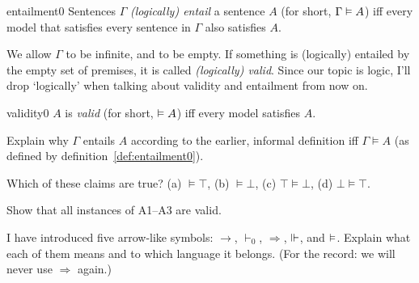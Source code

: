 \begin{definition}{}{entailment0}
  Sentences $\Gamma$ \emph{(logically) entail} a sentence $A$
  (for short, $\Gamma \vDash A$)
  iff every model that satisfies every sentence in $\Gamma$ also satisfies $A$.
\end{definition}


We allow $\Gamma$ to be infinite, and to be empty.
If something is (logically) entailed by the empty set of premises, it is called \textit{(logically) valid}.
Since our topic is logic,
I'll drop `logically' when talking about validity and entailment from now on.

\begin{definition}{}{validity0}
  $A$ is \emph{valid} (for short, $\vDash A$) iff every model satisfies $A$.
\end{definition}

\begin{exercise}
  Explain why $\Gamma$ entails $A$ according to the earlier, informal definition
  iff $\Gamma \models A$ (as defined by definition~\ref{def:entailment0}).
\end{exercise}

\begin{exercise}
  Which of these claims are true? (a) $\models \top$, (b) $\models \bot$, (c) $\top \models \bot$, (d) $\bot \models \top$.
\end{exercise}


\begin{exercise}\label{ex:axioms-valid}
  Show that all instances of A1--A3 are valid.
\end{exercise}

\begin{exercise}
  I have introduced five arrow-like symbols:
  $\to$, $\vdash_{0}$, $\Rightarrow$, $\Vdash$, and $\vDash$.
  Explain what each of them means and to which language it belongs.
  (For the record: we will never use $\Rightarrow$ again.)
\end{exercise}



